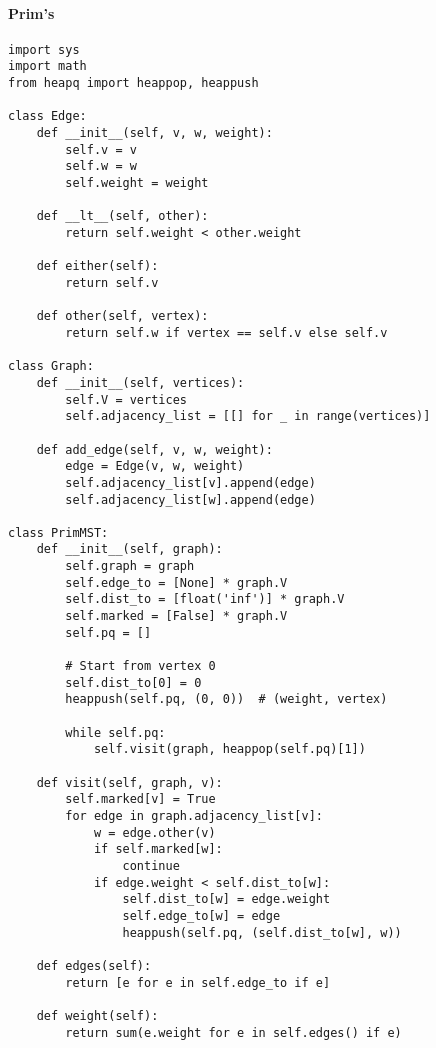 \documentclass{article}
\begin{document}
\paragraph{Prim's}

\begin{verbatim}
import sys
import math
from heapq import heappop, heappush

class Edge:
    def __init__(self, v, w, weight):
        self.v = v
        self.w = w
        self.weight = weight

    def __lt__(self, other):
        return self.weight < other.weight

    def either(self):
        return self.v

    def other(self, vertex):
        return self.w if vertex == self.v else self.v

class Graph:
    def __init__(self, vertices):
        self.V = vertices
        self.adjacency_list = [[] for _ in range(vertices)]

    def add_edge(self, v, w, weight):
        edge = Edge(v, w, weight)
        self.adjacency_list[v].append(edge)
        self.adjacency_list[w].append(edge)

class PrimMST:
    def __init__(self, graph):
        self.graph = graph
        self.edge_to = [None] * graph.V
        self.dist_to = [float('inf')] * graph.V
        self.marked = [False] * graph.V
        self.pq = []

        # Start from vertex 0
        self.dist_to[0] = 0
        heappush(self.pq, (0, 0))  # (weight, vertex)

        while self.pq:
            self.visit(graph, heappop(self.pq)[1])

    def visit(self, graph, v):
        self.marked[v] = True
        for edge in graph.adjacency_list[v]:
            w = edge.other(v)
            if self.marked[w]:
                continue
            if edge.weight < self.dist_to[w]:
                self.dist_to[w] = edge.weight
                self.edge_to[w] = edge
                heappush(self.pq, (self.dist_to[w], w))

    def edges(self):
        return [e for e in self.edge_to if e]

    def weight(self):
        return sum(e.weight for e in self.edges() if e)
\end{verbatim}
\end{document}
